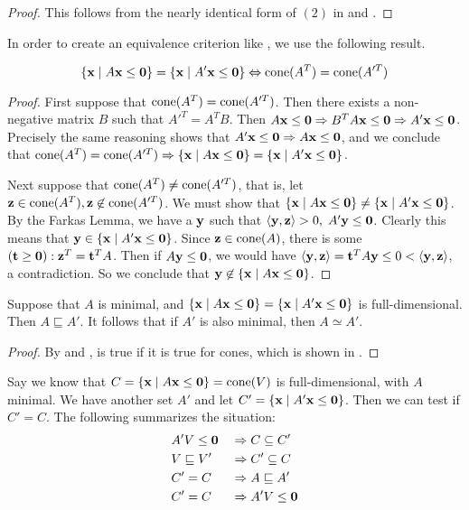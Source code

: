\begin{proof}
	This follows from the nearly identical form of $(2)$ in  and .
\end{proof}

In order to create an equivalence criterion like , we use the following result.

\begin{Thm}\label{dual_cone}
	\[ \HC{A} = \HC{A'} \Leftrightarrow \cone(A^T) = \cone(A'^T) \]
\end{Thm}

\begin{proof}
	First suppose that $\cone(A^T) = \cone(A'^T)$.  Then there exists a non-negative matrix $B$ such that $A'^T = A^TB$.  Then $A\x \leq \0 \Rightarrow B^TA\x\leq \0 \Rightarrow A'\x\leq\0$.  Precisely the same reasoning shows that $A'\x\leq\0 \Rightarrow A\x\leq\0$, and we conclude that $\cone(A^T) = \cone(A'^T) \Rightarrow \HC{A} = \HC{A'}$.

	Next suppose that $\cone(A^T) \neq \cone(A'^T)$, that is, let $\z \in \cone(A^T), \z \not\in\cone(A'^T)$.  We must show that $\HC{A} \neq \HC{A'}$.  By the Farkas Lemma, we have a $\y$ such that $\ip{\y}{\z} > 0,\; A'\y \leq \0$.  Clearly this means that $\y \in \HC{A'}$.  Since $\z \in \cone(A)$, there is some $(\t \geq \0): \z^T = \t^T A$.  Then if $A\y\leq\0$, we would have $\ip{\y}{\z} = \t^T A\y \leq 0 < \ip{\y}{\z}$, a contradiction.  So we conclude that $\y\not\in\HC{A}$.
\end{proof}

\begin{Prop}\label{min_full_dim_generators}
	Suppose that $A$ is minimal, and $\HC{A} = \HC{A'}$ is full-dimensional.  Then $A\sqsubseteq A'$.  It follows that if $A'$ is also minimal, then $A\simeq A'$.
\end{Prop}

\begin{proof}
	By  and ,  is true if it is true for cones, which is shown in .
\end{proof}

Say we know that $C = \HC{A} = \cone(V)$ is full-dimensional, with $A$ minimal.  We have another set $A'$ and let $C' = \HC{A'}$.  Then we can test if $C' = C$.  The following summarizes the situation:
\begin{alignat*}{2}
	 & A'V\leq\0 \;        & \Rightarrow & \; C \subseteq C'   \\
	 & V \sqsubseteq V' \; & \Rightarrow & \; C'\subseteq C    \\
	 & C' = C \;           & \Rightarrow & \; A \sqsubseteq A' \\
	 & C' = C \;           & \Rightarrow & \; A'V\leq\0
\end{alignat*}

